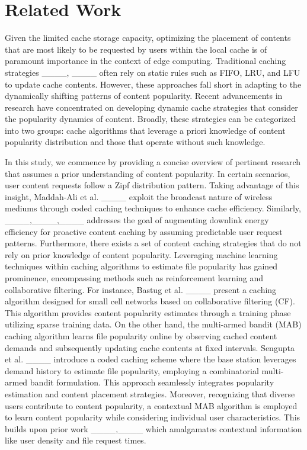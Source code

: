 \section{Related Work}
Given the limited cache storage capacity, optimizing the placement of contents that are most likely to be requested by users within the local cache is of paramount importance in the context of edge computing. Traditional caching strategies ____, ____ often rely on static rules such as FIFO, LRU, and LFU to update cache contents. However, these approaches fall short in adapting to the dynamically shifting patterns of content popularity. Recent advancements in research have concentrated on developing dynamic cache strategies that consider the popularity dynamics of content. Broadly, these strategies can be categorized into two groups: cache algorithms that leverage a priori knowledge of content popularity distribution and those that operate without such knowledge.

In this study, we commence by providing a concise overview of pertinent research that assumes a prior understanding of content popularity. In certain scenarios, user content requests follow a Zipf distribution pattern. Taking advantage of this insight, Maddah-Ali et al. ____ exploit the broadcast nature of wireless mediums through coded caching techniques to enhance cache efficiency. Similarly, ____,____,____ addresses the goal of augmenting downlink energy efficiency for proactive content caching by assuming predictable user request patterns. Furthermore, there exists a set of content caching strategies that do not rely on prior knowledge of content popularity. Leveraging machine learning techniques within caching algorithms to estimate file popularity has gained prominence, encompassing methods such as reinforcement learning and collaborative filtering. For instance, Bastug et al. ____ present a caching algorithm designed for small cell networks based on collaborative filtering (CF). This algorithm provides content popularity estimates through a training phase utilizing sparse training data. On the other hand, the multi-armed bandit (MAB) caching algorithm learns file popularity online by observing cached content demands and subsequently updating cache contents at fixed intervals. Sengupta et al. ____ introduce a coded caching scheme where the base station leverages demand history to estimate file popularity, employing a combinatorial multi-armed bandit formulation. This approach seamlessly integrates popularity estimation and content placement strategies. Moreover, recognizing that diverse users contribute to content popularity, a contextual MAB algorithm is employed to learn content popularity while considering individual user characteristics. This builds upon prior work ____,____ which amalgamates contextual information like user density and file request times.

